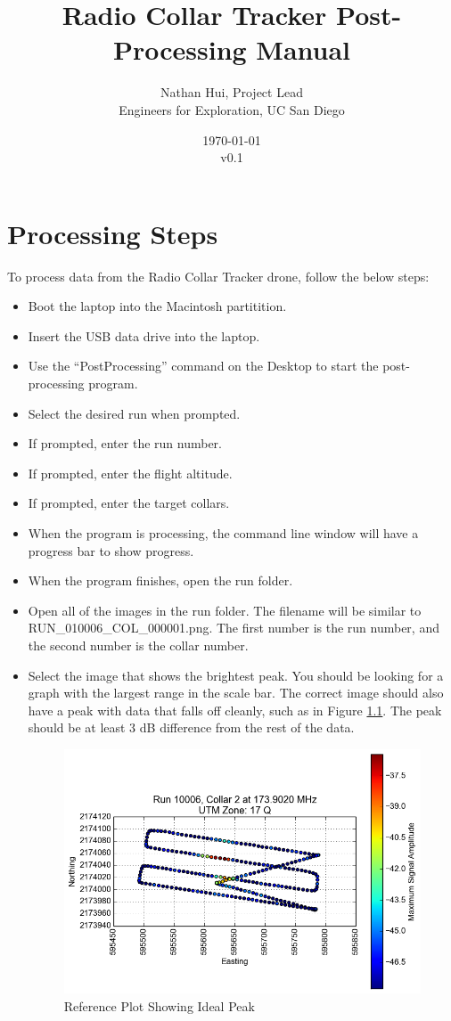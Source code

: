 \documentclass{report}
\title{Radio Collar Tracker Post-Processing Manual}
\author{Nathan Hui, Project Lead\\Engineers for Exploration, UC San Diego}
\date{\today\\v0.1}
\begin{document}
\maketitle
\tableofcontents
\chapter{Processing Steps}
	To process data from the Radio Collar Tracker drone, follow the below steps:
	\begin{itemize}
		\item Boot the laptop into the Macintosh partitition.
		\item Insert the USB data drive into the laptop.
		\item Use the ``PostProcessing'' command on the Desktop to start the post-processing program.
		\item Select the desired run when prompted.
		\item If prompted, enter the run number.
		\item If prompted, enter the flight altitude.
		\item If prompted, enter the target collars.
		\item When the program is processing, the command line window will have a progress bar to show progress.
		\item When the program finishes, open the run folder.
		\item Open all of the images in the run folder.  The filename will be similar to RUN\_010006\_COL\_000001.png.  The first number is the run number, and the second number is the collar number.
		\item Select the image that shows the brightest peak.  You should be looking for a graph with the largest range in the scale bar.  The correct image should also have a peak with data that falls off cleanly, such as in Figure \ref{fig:reference_plot}.  The peak should be at least 3 dB difference from the rest of the data.
			\begin{figure}[ht]
				\centering
				\caption{Reference Plot Showing Ideal Peak}
				\label{fig:reference_plot}
				\includegraphics[width=\textwidth]{RUN_010006_COL_000002.png}

\end{figure}
\end{itemize}
\end{document}
